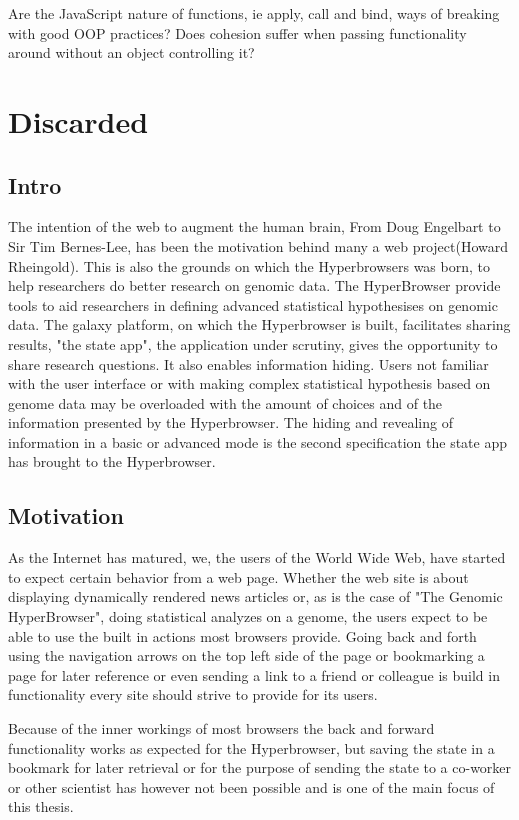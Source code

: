 \documentclass[english]{ifimaster}
\begin{document}
 Are the JavaScript nature of functions, ie apply, call and bind, ways of breaking with good OOP practices? Does cohesion suffer when passing functionality around without an object controlling it?

\section{Discarded}

\subsection{Intro}
The intention of the web to augment the human brain, From Doug Engelbart to Sir Tim Bernes-Lee, has been the motivation behind many a web project(Howard Rheingold). This is also the grounds on which the Hyperbrowsers was born, to help researchers do better research on genomic data. The HyperBrowser provide tools to aid researchers in defining advanced statistical hypothesises on genomic data. The galaxy platform, on which the Hyperbrowser is built, facilitates sharing results, "the state app", the application under scrutiny, gives the opportunity to share research questions. It also enables information hiding. Users not familiar with the user interface or with making complex statistical hypothesis based on genome data may be overloaded with the amount of choices and of the information presented by the Hyperbrowser. The hiding and revealing of information in a basic or advanced mode is the second specification the state app has brought to the Hyperbrowser.

\subsection{Motivation}
As the Internet has matured, we, the users of the World Wide Web, have started to expect certain behavior from a web page\parencite[p.85]{mikowski}. Whether the web site is about displaying dynamically rendered news articles or, as is the case of "The Genomic HyperBrowser", doing statistical analyzes on a genome, the users expect to be able to use the built in actions most browsers provide. Going back and forth using the navigation arrows on the top left side of the page or bookmarking a page for later reference or even sending a link to a friend or colleague is build in functionality every site should strive to provide for its users.

Because of the inner workings of most browsers the back and forward functionality works as expected for the Hyperbrowser, but saving the state in a bookmark for later retrieval or for the purpose of sending the state to a co-worker or other scientist has however not been possible and is one of the main focus of this thesis.
\end{document}
